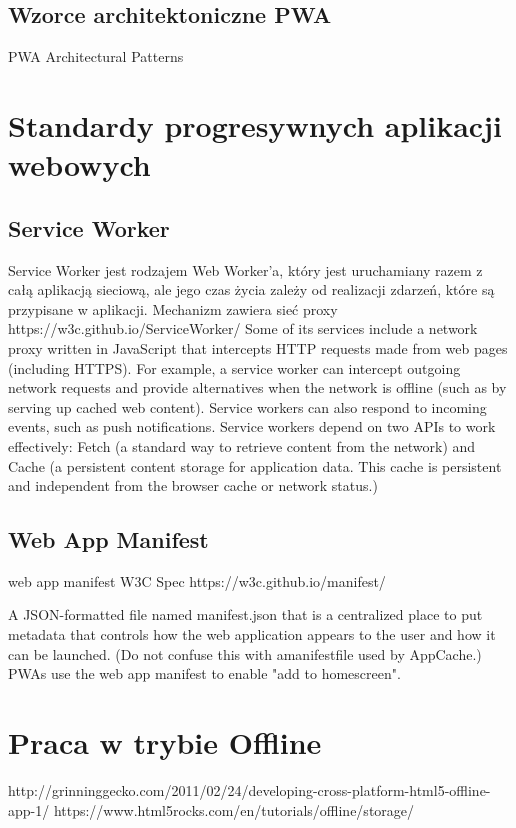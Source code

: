 \documentclass[a4paper,12pt,twoside,openany]{report}
\begin{document}
\subsection*{Wzorce architektoniczne PWA}
PWA Architectural Patterns
\section{Standardy progresywnych aplikacji webowych}
\subsection{Service Worker} \label{subs:sw}
Service Worker jest rodzajem Web Worker'a, który jest uruchamiany razem z całą aplikacją sieciową, ale jego czas życia zależy od realizacji zdarzeń, które są przypisane w aplikacji. Mechanizm zawiera sieć proxy 
https://w3c.github.io/ServiceWorker/
Some of its services include a network proxy written in JavaScript that intercepts HTTP requests made from web pages (including HTTPS). For example, a service worker can intercept outgoing network requests and provide alternatives when the network is offline (such as by serving up cached web content). Service workers can also respond to incoming events, such as push notifications.
Service workers depend on two APIs to work effectively: Fetch (a standard way to retrieve content from the network) and Cache (a persistent content storage for application data. This cache is persistent and independent from the browser cache or network status.)

\subsection{Web App Manifest} \label{subs:manifest}
web app manifest W3C Spec https://w3c.github.io/manifest/

A JSON-formatted file named manifest.json that is a centralized place to put metadata that controls how the web application appears to the user and how it can be launched. (Do not confuse this with amanifestfile used by AppCache.) PWAs use the web app manifest to enable "add to homescreen".
\section{Praca w trybie Offline}
http://grinninggecko.com/2011/02/24/developing-cross-platform-html5-offline-app-1/
https://www.html5rocks.com/en/tutorials/offline/storage/
\end{document}
